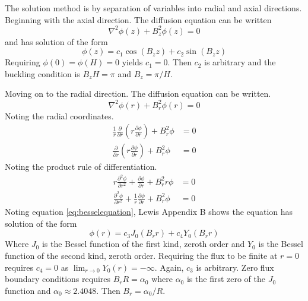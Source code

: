\documentclass{article}
\begin{document}
  The solution method is by separation of variables into radial and axial 
  directions. Beginning with the axial direction. The diffusion equation can 
  be written
  \begin{equation} \label{eq:simplediffusion}
    \nabla^2 \phi(z) + B_z^2 \phi(z) = 0
  \end{equation}
  and has solution of the form
  \begin{equation} \label{eq:cyl_axial}
    \phi(z) = c_1 \cos(B_z z) + c_2 \sin(B_z z)
  \end{equation}
  Requiring $\phi(0)=\phi(H)=0$ yields $c_1=0$. Then $c_2$ is arbitrary and 
  the buckling condition is $B_zH=\pi$ and $B_z=\pi/H$.
  
  Moving on to the radial direction. The diffusion equation can be written.
  \begin{equation}
    \nabla^2 \phi(r) + B_r^2 \phi(r) = 0
  \end{equation}
  Noting the radial coordinates.
  \begin{align}
    \frac{1}{r} \frac{\partial}{\partial r} \left( r \frac{\partial \phi}
      {\partial r} \right) + B_r^2 \phi &= 0 \\
    \frac{\partial}{\partial r} \left( r \frac{\partial \phi}{\partial r}
      \right) + B_r^2 \phi &= 0
  \end{align}
  Noting the product rule of differentiation.
  \begin{align}
    r \frac{\partial^2 \phi}{\partial r^2} + \frac{\partial \phi}
      {\partial r} + B_r^2 r \phi &= 0 \\
    \frac{\partial^2 \phi}{\partial r^2} + \frac{1}{r} \frac{\partial \phi}
      {\partial r} + B_r^2 \phi &= 0 \label{eq:besselequation}
  \end{align}
  Noting equation \eqref{eq:besselequation}, Lewis Appendix B shows the 
  equation has solution of the form
  \begin{equation} \label{eq:cyl_radial}
    \phi(r) = c_3 J_0(B_r r) + c_4 Y_0(B_r r)
  \end{equation}
  Where $J_0$ is the Bessel function of the first kind, zeroth order and $Y_0$
  is the Bessel function of the second kind, zeroth order. Requiring the flux
  to be finite at $r=0$ requires $c_4=0$ as 
  $\lim_{r\rightarrow0} Y_0(r)=-\infty$. Again, $c_3$ is arbitrary. Zero flux 
  boundary conditions requires $B_r R=\alpha_0$ where $\alpha_0$ is the first 
  zero of the $J_0$ function and $\alpha_0 \approx 2.4048$. Then 
  $B_r=\alpha_0/R$.
  
\end{document}
